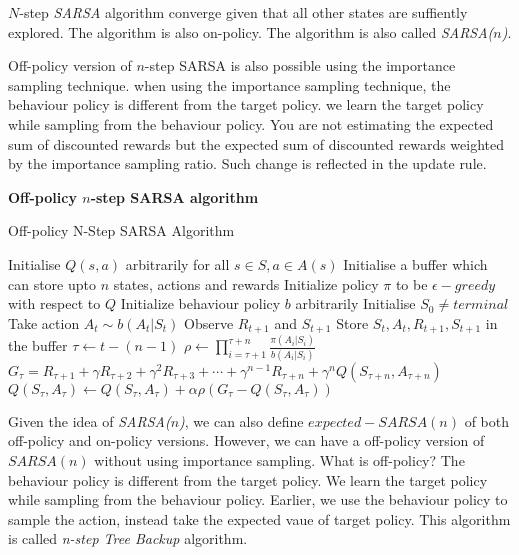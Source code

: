 \documentclass[../main.tex]{subfiles}
\begin{document}
$N$-step \emph{SARSA} algorithm converge given that all other states are suffiently explored. The algorithm is also on-policy. The algorithm is also called \emph{SARSA($n$)}.

Off-policy version of $n$-step SARSA is also possible using the importance sampling technique. when using the importance sampling technique, the behaviour policy is different from the target policy. we learn the target policy while sampling from the behaviour policy. You are not estimating the expected sum of discounted rewards but the expected sum of discounted rewards weighted by the importance sampling ratio. Such change is reflected in the update rule. 

\textbf{Off-policy $n$-step SARSA algorithm}

\begin{algorithm}[H]
\caption{Off-policy N-Step SARSA Algorithm}
\label{alg:offpolicy_nstep_sarsa}
\begin{algorithmic}[1]
\State Initialise $Q(s,a)$ arbitrarily for all $s \in S, a \in A(s)$
\State Initialise a buffer which can store upto $n$ states, actions and rewards
\State Initialize policy $\pi$ to be  $\epsilon-greedy$ with respect to $Q$
\State Initialize behaviour policy $b$ arbitrarily
\State Initialise $S_0 \neq terminal $
\State Take action $A_t \sim b(A_t|S_t)$
\State Observe $R_{t+1}$ and $S_{t+1}$
\State Store $S_t, A_t, R_{t+1}, S_{t+1}$ in the buffer
\State $\tau \gets t - (n - 1)$
\State $\rho \gets  \prod_{i=\tau +1}^{\tau +n} \frac{\pi(A_i|S_i)}{b(A_i|S_i)}  $
\State $G_\tau = R_{\tau+1} + \gamma R_{\tau+2} + \gamma^2 R_{\tau+3} + \cdots + \gamma^{n-1} R_{\tau+n} + \gamma^n Q(S_{\tau+n}, A_{\tau+n})$
\State $Q(S_\tau, A_\tau) \leftarrow Q(S_\tau, A_\tau) + \alpha \rho (G_\tau - Q(S_\tau, A_\tau))$
\EndIf
\EndFor
\EndWhile
\end{algorithmic}
\end{algorithm}

Given the idea of \emph{SARSA($n$)}, we can also define  $expected-SARSA(n)$
of both off-policy and on-policy versions. However, we can have a off-policy version of $SARSA(n)$ without using importance sampling.
What is off-policy? The behaviour policy is different from the target policy. We learn the target policy while sampling from the behaviour policy. Earlier, we use the behaviour policy to sample the action, instead take the expected vaue of target policy. This algorithm is called \emph{n-step Tree Backup} algorithm.
\end{document}
